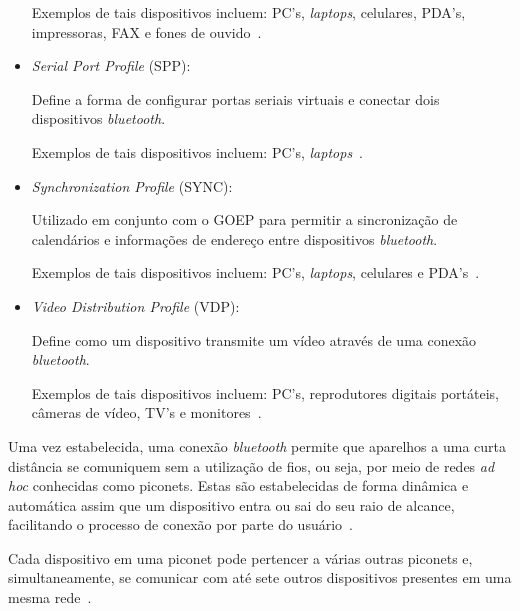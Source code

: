 \begin{itemize}
	Exemplos de tais dispositivos incluem: PC's, \emph{laptops}, celulares, PDA's, impressoras, FAX e fones de ouvido~\cite{bluetoothprofilesSDAP}.
	\item \emph{Serial Port Profile} (SPP): 

	Define a forma de configurar portas seriais virtuais e conectar dois dispositivos \emph{bluetooth}.

	Exemplos de tais dispositivos incluem: PC's, \emph{laptops}~\cite{bluetoothprofilesSPP}.
	\item \emph{Synchronization Profile} (SYNC): 

	Utilizado em conjunto com o GOEP para permitir a sincronização de calendários e informações de endereço entre dispositivos \emph{bluetooth}.

	Exemplos de tais dispositivos incluem: PC's, \emph{laptops}, celulares e PDA's~\cite{bluetoothprofilesSYNC}.
	\item \emph{Video Distribution Profile} (VDP): 

	Define como um dispositivo transmite um vídeo através de uma conexão \emph{bluetooth}.

	Exemplos de tais dispositivos incluem: PC's, reprodutores digitais portáteis, câmeras de vídeo, TV's e monitores~\cite{bluetoothprofilesVDP}.
\end{itemize}

Uma vez estabelecida, uma conexão \emph{bluetooth} permite que aparelhos a uma curta distância se comuniquem sem a utilização de fios, ou seja, por meio de redes \emph{ad hoc} conhecidas como piconets. Estas são estabelecidas de forma dinâmica e automática assim que um dispositivo entra ou sai do seu raio de alcance, facilitando o processo de conexão por parte do usuário~\cite{bluetoothoverview}.

Cada dispositivo em uma piconet pode pertencer a várias outras piconets e, simultaneamente, se comunicar com até sete outros dispositivos presentes em uma mesma rede~\cite{bluetoothoverview}.

